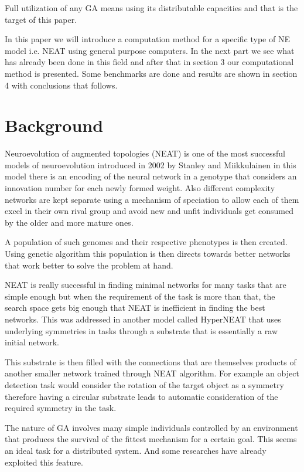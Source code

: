 \documentclass[twocolumn]{article}
\begin{document}
Full utilization of any GA means using its distributable capacities and that is the target of this paper.

In this paper we will introduce a computation method for a specific type of NE model i.e. NEAT using general purpose computers. In the next part we see what has already been done in this field and after that in section 3 our computational method is presented. Some benchmarks are done and results are shown in section 4 with conclusions that follows.


\section{Background}
Neuroevolution of augmented topologies (NEAT) is one of the most successful models of neuroevolution introduced in 2002 by Stanley and Miikkulainen \cite{originalNEAT} in this model there is an encoding of the neural network in a genotype that considers an innovation number for each newly formed weight. Also different complexity networks are kept separate using a mechanism of speciation to allow each of them excel in their own rival group and avoid new and unfit individuals get consumed by the older and more mature ones.

A population of such genomes and their respective phenotypes is then created. Using genetic algorithm this population is then directs towards better networks that work better to solve the problem at hand.

NEAT is really successful in finding minimal networks for many tasks that are simple enough but when the requirement of the task is more than that, the search space gets big enough that NEAT is inefficient in finding the best networks. This was addressed in another model called HyperNEAT \cite{originalHyperNEAT} that uses underlying symmetries in tasks through a substrate that is essentially a raw initial network.

This substrate is then filled with the connections that are themselves products of another smaller network trained through NEAT algorithm. For example an object detection task would consider the rotation of the target object as a symmetry therefore having a circular substrate leads to automatic consideration of the required symmetry in the task.

The nature of GA involves many simple individuals controlled by an environment that produces the survival of the fittest mechanism for a certain goal. This seems an ideal task for a distributed system. And some researches have already exploited this feature.
\end{document}
